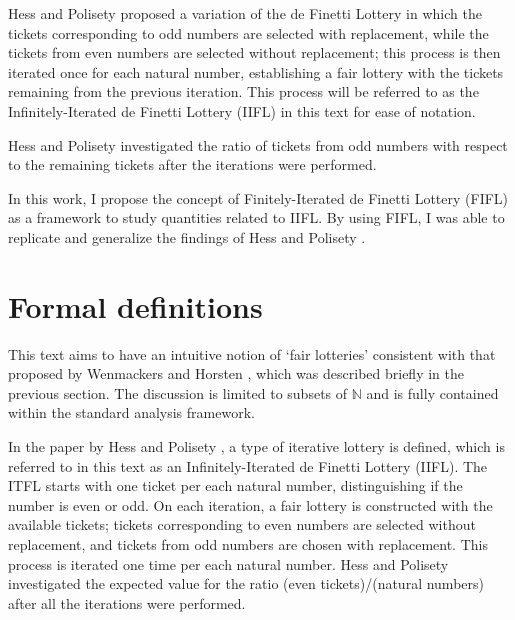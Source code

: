 \documentclass{article}
\newcommand{\N}{\mathbb{N}}
\begin{document}
Hess and Polisety \cite{hess2023} proposed a variation of the de Finetti Lottery in which the tickets corresponding to odd numbers are selected with replacement, while the tickets from even numbers are selected without replacement;
this process is then iterated once for each natural number, establishing a fair lottery with the tickets remaining from the previous iteration.
%
This process will be referred to as the Infinitely-Iterated de Finetti Lottery (IIFL) in this text for ease of notation.

Hess and Polisety \cite{hess2023} investigated the ratio of tickets from odd numbers with respect to the remaining tickets after the iterations were performed.

In this work, I propose the concept of Finitely-Iterated de Finetti Lottery (FIFL) as a framework to study quantities related to IIFL.
%
By using FIFL, I was able to replicate and generalize the findings of Hess and Polisety \cite{hess2023}.


\section{Formal definitions}

This text aims to have an intuitive notion of `fair lotteries' consistent with that proposed by Wenmackers and Horsten \cite{fair_infinite_lottery}, which was described briefly in the previous section.
%
The discussion is limited to subsets of $\N$ and is fully contained within the standard analysis framework.


In the paper by Hess and Polisety \cite{hess2023}, a type of iterative lottery is defined, which is referred to in this text as an Infinitely-Iterated de Finetti Lottery (IIFL).
%
The ITFL starts with one ticket per each natural number, distinguishing if the number is even or odd.
%
On each iteration, a fair lottery is constructed with the available tickets; tickets corresponding to even numbers are selected without replacement, and tickets from odd numbers are chosen with replacement.
%
This process is iterated one time per each natural number.
%
Hess and Polisety investigated the expected value for the ratio (even tickets)/(natural numbers) after all the iterations were performed.
\end{document}
